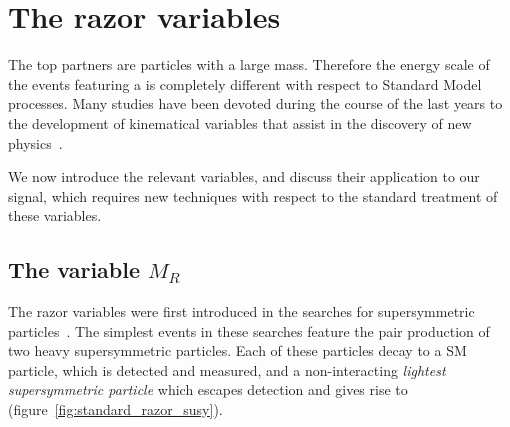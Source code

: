 \chapter{The razor variables}
The top partners are particles with a large mass. Therefore the energy scale
of the events featuring a \TP is completely different with respect to
Standard Model processes. Many studies have been devoted during the course
of the last years to the development of kinematical variables that assist in
the discovery of new
physics~\cite{Rogan:2010kb,PhysRevLett.101.2203,Allanach:2000kt,Hubisz:2008gg,Polesello:2009rn}.

We now introduce the relevant variables, and discuss their application to
our signal, which requires new techniques with respect to the standard
treatment of these variables.

\section{The variable $M_R$}\label{sec:mr}
The razor variables were first introduced in the searches for supersymmetric
particles~\cite{CMS-PAS-SUS-11-024}. The simplest events in these searches
feature the pair production of two heavy supersymmetric particles. Each of
these particles decay to a SM particle, which is detected and measured, and
a non-interacting \emph{lightest supersymmetric particle} which escapes
detection and gives rise to \met (figure~\ref{fig:standard_razor_susy}).

